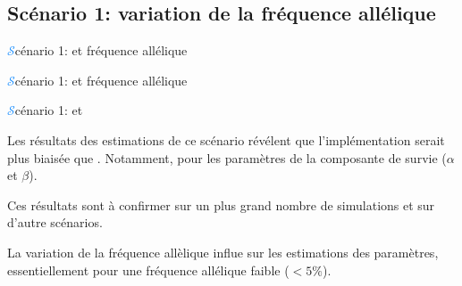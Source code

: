 \subsection{Scénario 1: variation de la fréquence allélique}
\begin{frame}{{\huge\textcolor{dodgerblue}{$\mathcal{S}$}}cénario 1:  et fréquence allélique}
\begin{center}
\end{center}
\end{frame}
\begin{frame}{{\huge\textcolor{dodgerblue}{$\mathcal{S}$}}cénario 1:  et fréquence allélique}
\begin{center}
\end{center}
\end{frame}
\begin{frame}{{\huge\textcolor{dodgerblue}{$\mathcal{S}$}}cénario 1:  et }
\par{Les résultats des estimations de ce scénario révélent que l'implémentation  serait plus biaisée que .
Notamment, pour les paramètres de la composante de survie (\textcolor{springgreen3}{$\alpha$} et
\textcolor{springgreen3}{$\beta$}).}
\par{Ces résultats sont à confirmer sur un plus grand nombre de simulations et sur d'autre scénarios.}
\vspace{1em}
\par{La variation de la fréquence allèlique influe sur les estimations des paramètres, essentiellement pour une fréquence
allélique faible (\textcolor{springgreen3}{$<5\%$}).}
\end{frame}

